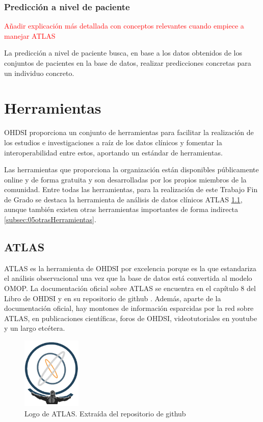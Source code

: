 \subsubsection{Predicción a nivel de paciente}

\textcolor{red}{Añadir explicación más detallada con conceptos relevantes cuando empiece a manejar ATLAS}

La predicción a nivel de paciente busca, en base a los datos obtenidos de los conjuntos de pacientes en la base de datos, realizar predicciones concretas para un individuo concreto.

\section{Herramientas} \label{sec:05herramientas}

OHDSI proporciona un conjunto de herramientas para facilitar la realización de los estudios e investigaciones a raíz de los datos clínicos y fomentar la interoperabilidad entre estos, aportando un estándar de herramientas. 

Las herramientas que proporciona la organización están disponibles públicamente online y de forma gratuita y son desarrolladas por los propios miembros de la comunidad. Entre todas las herramientas, para la realización de este Trabajo Fin de Grado se destaca la herramienta de análisis de datos clínicos ATLAS \ref{subsec:05ATLAS}, aunque también existen otras herramientas importantes de forma indirecta \ref{subsec:05otrasHerramientas}.

\subsection{ATLAS} \label{subsec:05ATLAS}

ATLAS es la herramienta de OHDSI por excelencia porque es la que estandariza el análisis observacional una vez que la base de datos está convertida al modelo OMOP. La documentación oficial sobre ATLAS se encuentra en el capítulo 8 del Libro de OHDSI y en su repositorio de github \cite{githubATLAS}. Además, aparte de la documentación oficial, hay montones de información esparcidas por la red sobre ATLAS, en publicaciones científicas, foros de OHDSI, videotutoriales en youtube y un largo etcétera.

\begin{figure}[H]
\centering
\includegraphics[width=0.25\textwidth]{figures/ATLASlogo.png}
     \caption{Logo de ATLAS. Extraída del repositorio de github \cite{githubATLAS}}
    \label{fig:ATLASlogo}
\end{figure}

